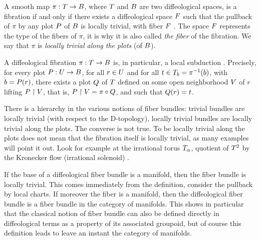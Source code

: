 \begin{article}
  \label{Fibrations-and-local-triviality-along-the-plots}
  A smooth map $\pi : \T \to \B$,
  where $\T$ and $\B$ are two
  diffeological spaces,
  is a fibration  if and only if there exists a diffeological space $\F$ such that the pullback of $\pi$ by any plot $\P$ of $\B$ is locally trivial,
  with fiber $\F$ .
  The space $\F$ represents the type of the fibers of $\pi$,
  it is why it is also called {\em the fiber} of the fibration.
  We say that $\pi$ is {\em locally trivial along the plots} (of $\B$).
  
   A diffeological fibration $\pi : \T \to \B$ is,
  in particular,
  a local subduction .
  Precisely,
  for every plot $\P : \U \to \B$,
  for all $r \in \U$ and for all $t \in \T_b = \pi^{-1}(b)$,
  with $b = \P(r)$,
  there exists a plot $\Q$ of $\T$ defined on some open neighborhood $\V$ of $r$ lifting $\P \restriction \V$,
  that is,
  $\P \restriction \V = \pi \circ \Q$,
  and such that $\Q(r) = t$.
  
    There is a hierarchy in the various notions of fiber bundles:
  trivial bundles are locally trivial (with respect to the D-topology),
  locally trivial bundles are locally trivial along the plots.
  The converse is not true.
  To be locally trivial along the plots does not mean that the fibration itself is locally trivial,
  as many examples will point it out.
  Look for example at the irrational torus $\Torus_\alpha$,
  quotient of $\T^2$ by the Kronecker flow (irrational solenoid) .
  
   If the base of a diffeological fiber bundle is a manifold,
  then the fiber bundle is locally trivial.
  This comes immediately from
  the definition,
  consider the pullback by local charts.
  If moreover the fiber is a manifold,
  then the diffeological fiber bundle is a fiber bundle in the category of manifolds.
  This shows in particular that the classical notion of fiber bundle can also be defined directly in diffeological terms as a property of its associated groupoid,
  but of course this definition leads to leave an instant the category of manifolds.
\end{article} %

